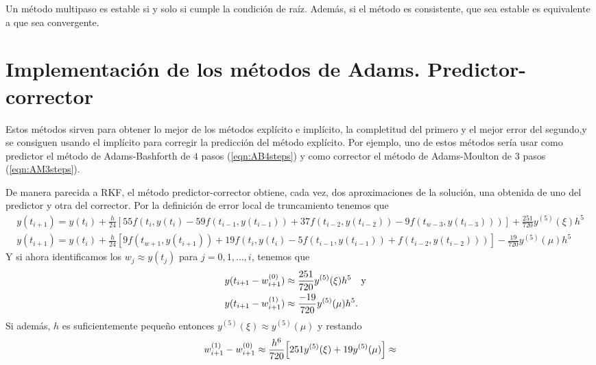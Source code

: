 \begin{theorem}
    Un método multipaso es estable si y solo si cumple la condición de raíz.
    Además, si el método es consistente,
    que sea estable es equivalente a que sea convergente.
\end{theorem}

\section{Implementación de los métodos de Adams. Predictor-corrector}

Estos métodos sirven para obtener lo mejor de los métodos explícito e implícito,
la completitud del primero y el mejor error del segundo,y se consiguen usando
el implícito para corregir la predicción del método explícito. Por ejemplo,
uno de estos métodos  sería usar como predictor el método de Adams-Bashforth 
de $4$ pasos (\cref{eqn:AB4steps}) y como corrector el método de Adams-Moulton
de $3$ pasos (\cref{eqn:AM3steps}).

De manera parecida a RKF, %
el método predictor-corrector obtiene, cada vez,
dos aproximaciones de la solución,
una obtenida de uno del predictor y otra del corrector.
Por la definición de error local de truncamiento tenemos que
\begin{gather*}
    y(t_{i+1}) = y(t_i) + \frac{h}{24}[
        55f(t_i,y(t_i) - 59f(t_{i-1},y(t_{i-1})) + 37f(t_{i-2}, y(t_{i-2}))
        - 9f(t_{w-3},y(t_{i-3})))
    ] + \frac{251}{720}y^{(5)}(\xi)h^5  \\
    y(t_{i+1}) = y(t_i) + \frac{h}{24}[
        9f(t_{w+1},y(t_{i+1})) + 19f(t_i,y(t_i) - 5f(t_{i-1},y(t_{i-1}))
        + f(t_{i-2}, y(t_{i-2})))
    ] - \frac{19}{720}y^{(5)}(\mu)h^5
\end{gather*}
Y si ahora identificamos los $w_j \approx y(t_j)$ para $j = 0,1,\dots, i$,
tenemos que
\begin{align*}
    y(t_{i+1} - w_{i+1}^{(0)}) \approx {} &
        \frac{251}{720}y^{(5)}(\xi)h^5 \qq{y} \\
    y(t_{i+1} - w_{i+1}^{(1)}) \approx {} &
        \frac{-19}{720}y^{(5)}(\mu)h^5.
\end{align*}
Si además, $h$ es suficientemente pequeño entonces
$y^{(5)}(\xi) \approx y^{(5)}(\mu)$
y restando
\begin{equation*}
    w_{i+1}^{(1)} - w_{i+1}^{(0)} \approx
    \frac{h^6}{720}\qty[251y^{(5)}(\xi) + 19y^{(5)}(\mu)] \approx
\end{equation*}

